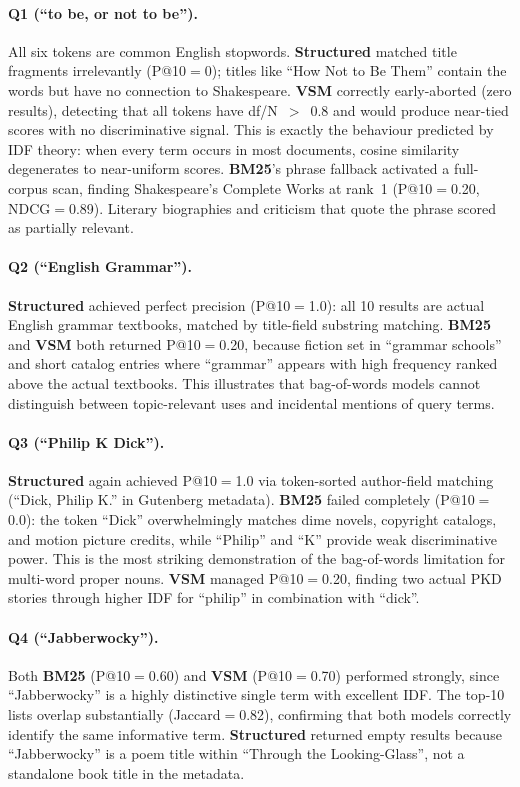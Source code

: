 \documentclass[sigconf,nonacm]{acmart}
\begin{document}
\paragraph{Q1 (``to be, or not to be'').}
All six tokens are common English stopwords.  \textbf{Structured} matched title
fragments irrelevantly (P@10$=$0); titles like ``How Not to Be Them'' contain
the words but have no connection to Shakespeare.  \textbf{VSM} correctly
early-aborted (zero results), detecting that all tokens have df/N~$>$~0.8 and
would produce near-tied scores with no discriminative signal.  This is exactly
the behaviour predicted by IDF theory: when every term occurs in most documents,
cosine similarity degenerates to near-uniform scores.  \textbf{BM25}'s phrase
fallback activated a full-corpus scan, finding Shakespeare's Complete Works at
rank~1 (P@10$=$0.20, NDCG$=$0.89).  Literary biographies and criticism that
quote the phrase scored as partially relevant.

\paragraph{Q2 (``English Grammar'').}
\textbf{Structured} achieved perfect precision (P@10$=$1.0): all 10 results
are actual English grammar textbooks, matched by title-field substring matching.
\textbf{BM25} and \textbf{VSM} both returned P@10$=$0.20, because fiction set
in ``grammar schools'' and short catalog entries where ``grammar'' appears with
high frequency ranked above the actual textbooks.  This illustrates that
bag-of-words models cannot distinguish between topic-relevant uses and
incidental mentions of query terms.

\paragraph{Q3 (``Philip K Dick'').}
\textbf{Structured} again achieved P@10$=$1.0 via token-sorted
author-field matching (``Dick, Philip K.'' in Gutenberg metadata).
\textbf{BM25} failed completely (P@10$=$0.0): the token ``Dick''
overwhelmingly matches dime novels, copyright catalogs, and motion
picture credits, while ``Philip'' and ``K'' provide weak discriminative
power.  This is the most striking demonstration of the bag-of-words
limitation for multi-word proper nouns.  \textbf{VSM} managed
P@10$=$0.20, finding two actual PKD stories through higher IDF for
``philip'' in combination with ``dick''.

\paragraph{Q4 (``Jabberwocky'').}
Both \textbf{BM25} (P@10$=$0.60) and \textbf{VSM} (P@10$=$0.70) performed
strongly, since ``Jabberwocky'' is a highly distinctive single term with
excellent IDF.  The top-10 lists overlap substantially (Jaccard$=$0.82),
confirming that both models correctly identify the same informative term.
\textbf{Structured} returned empty results because ``Jabberwocky'' is a poem
title within ``Through the Looking-Glass'', not a standalone book title in the
metadata.
\end{document}
